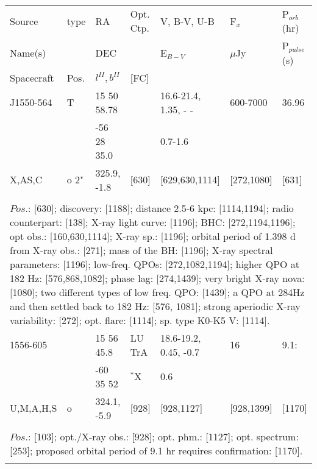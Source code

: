 \documentclass{aa}
\begin{document}
\begin{tabular}{p{2.5cm}p{1cm}p{1.8cm}p{2.3cm}p{3.3cm}p{2.0cm}p{2.2cm}}
\noalign{\smallskip}
\multicolumn{7}{p{17.5cm}}{Table 1.  (continued) }\\        
\hline
\noalign{\smallskip}
Source          & type  & RA                       &  Opt. Ctp. & V, B-V, U-B  & F$_{x}$          & P$_{orb}$(hr)    \\
Name(s)        &            & DEC                    &                     & E$_{B-V}$   & $\mu$Jy        & P$_{pulse}$(s) \\
Spacecraft  & Pos.  & $l^{II}, b^{II}$      &  [FC]           &                       &                         &                             \\
\noalign{\smallskip} 
\hline

\noalign{\smallskip}
J1550-564     & T      & 15 50 58.78    &                     & 16.6-21.4, 1.35, - -   & 600-7000          & 36.96    \\
                        &          &  -56 28 35.0    &                     &  0.7-1.6                      &                              &               \\
X,AS,C          & o 2"   & 325.9, -1.8      &   [630]         & [629,630,1114]        & [272,1080]         & [631]  \\
\\
\multicolumn{7}{p{17.5cm}}{
$Pos$.: [630]; discovery: [1188]; distance 2.5-6 kpc: [1114,1194]; radio counterpart: [138]; X-ray light curve: [1196]; 
BHC: [272,1194,1196]; opt obs.: [160,630,1114]; X-ray sp.: [1196]; orbital period of 1.398 d from X-ray obs.: [271]; 
mass of the BH: [1196]; X-ray spectral parameters: [1196]; low-freq. QPOs: [272,1082,1194]; higher QPO at 182 Hz: 
[576,868,1082]; phase lag: [274,1439]; very bright X-ray nova: [1080]; two different types of low freq. QPO: [1439]; 
a QPO at 284Hz and then settled back to 182 Hz: [576, 1081]; 
strong aperiodic X-ray variability: [272]; opt. flare: [1114]; sp. type K0-K5 V: [1114].}\\
\noalign{\smallskip}
\hline

\noalign{\smallskip}
1556-605       &                & 15 56 45.8       & LU TrA           & 18.6-19.2, 0.45, -0.7  & 16                     & 9.1:     \\
                        &                & -60 35 52         & $^*$X              & 0.6                                &                          &             \\
U,M,A,H,S     & o            & 324.1, -5.9       &  [928]               & [928,1127]                   & [928,1399]     & [1170]  \\
\\
\multicolumn{7}{p{17.5cm}}{
$Pos$.: [103]; opt./X-ray obs.: [928]; opt. phm.: [1127]; opt. spectrum: [253]; proposed orbital period of 9.1 hr requires 
confirmation: [1170].}\\
\noalign{\smallskip}
\hline


\end{tabular}
\end{document}
